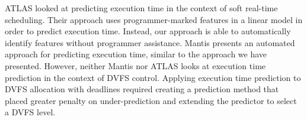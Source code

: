 ATLAS \cite{atlas-rtas13} looked at predicting execution time in the context of
soft real-time scheduling. Their approach uses programmer-marked features in a
linear model in order to predict execution time. Instead, our approach is able
to automatically identify features without programmer assistance.  Mantis
\cite{mantis-atc13} presents an automated approach for predicting execution
time, similar to the approach we have presented. However, neither Mantis nor
ATLAS looks at execution time prediction in the context of DVFS control.
Applying execution time prediction to DVFS allocation with deadlines required
creating a prediction method that placed greater penalty on under-prediction
and extending the predictor to select a DVFS level.

% 
% 
% 
% 
